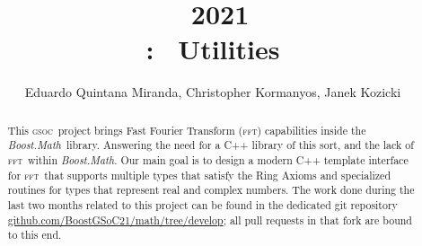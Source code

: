 \documentclass[11pt,a4paper]{article}
\title{\gsoc\ 2021\\\boostmath: \fft\ Utilities}
\author{Eduardo Quintana Miranda, Christopher Kormanyos, Janek Kozicki}
\newcommand{\fft}{\textsc{fft}}
\newcommand{\gsoc}{\textsc{gsoc}}
\newcommand{\boostmath}{\textit{Boost.Math}}
\begin{document}
\maketitle
\begin{abstract}
This \gsoc\ project brings Fast Fourier Transform (\fft) capabilities
inside the \boostmath\ library. Answering the need for a C++ library
of this sort, and the lack of \fft\ within \boostmath.
Our main goal is to design a modern C++ template interface for \fft\
that supports multiple types that satisfy the Ring Axioms and specialized
routines for types that represent real and complex numbers.
The work done during the last two months related to this project
can be found in the dedicated git
repository \url{github.com/BoostGSoC21/math/tree/develop}; all pull requests
in that fork are bound to this end.
\end{abstract}

\tableofcontents








    


\appendix

\end{document}
